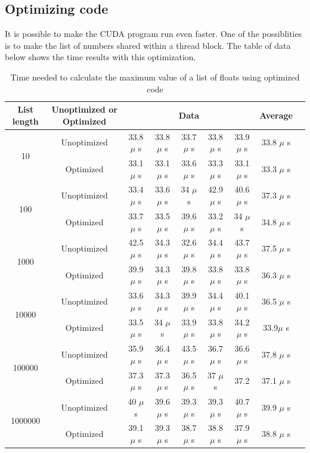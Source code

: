 \documentclass[a4paper]{article}
\begin{document}
  \subsection{Optimizing code}
  It is possible to make the CUDA program run even faster.
  One of the possiblities is to make the list of numbers shared within a thread block.
  The table of data below shows the time results with this optimization.
  \begin{table}[H]
    \caption{Time needed to calculate the maximum value of a list of floats using optimized code}
    \label{table:time}
    \begin{center}
	    \begin{tabular}{| c | c | c | c | c | c | c | c | c |}
	      \hline
	      List length & Unoptimized or Optimized & \multicolumn{5}{|c|}{Data} & Average\\
		    \hline
		    \multirow{2}{*}{10} & Unoptimized & 33.8 $\mu$ s & 33.8 $\mu$ s & 33.7 $\mu$ s & 33.8 $\mu$ s & 33.9 $\mu$ s & 33.8 $\mu$ s\\ 
		    \cline{2-8}
		    & Optimized & 33.1 $\mu$ s & 33.1 $\mu$ s & 33.6 $\mu$ s & 33.3 $\mu$ s & 33.1 $\mu$ s & 33.3 $\mu$ s\\ 
		    \hline
		    \multirow{2}{*}{100} & Unoptimized & 33.4 $\mu$ s & 33.6 $\mu$ s & 34 $\mu$ s & 42.9 $\mu$ s & 40.6 $\mu$ s & 37.3 $\mu$ s\\ 
		    \cline{2-8}
		    & Optimized & 33.7 $\mu$ s & 33.5 $\mu$ s & 39.6 $\mu$ s & 33.2 $\mu$ s & 34 $\mu$ s & 34.8 $\mu$ s\\ 
		    \hline
		    \multirow{2}{*}{1000} & Unoptimized & 42.5 $\mu$ s & 34.3 $\mu$ s & 32.6 $\mu$ s & 34.4 $\mu$ s & 43.7 $\mu$ s & 37.5 $\mu$ s\\  
		    \cline{2-8}
		    & Optimized & 39.9 $\mu$ s & 34.3 $\mu$ s & 39.8 $\mu$ s & 33.8 $\mu$ s & 33.8 $\mu$ s & 36.3 $\mu$ s\\  
		    \hline
		    \multirow{2}{*}{10000} & Unoptimized & 33.6 $\mu$ s & 34.3 $\mu$ s & 39.9 $\mu$ s & 34.4 $\mu$ s & 40.1 $\mu$ s & 36.5 $\mu$ s\\  
		    \cline{2-8}
		    & Optimized & 33.5 $\mu$ s & 34 $\mu$ s & 33.9 $\mu$ s & 33.8 $\mu$ s & 34.2 $\mu$ s & 33.9$\mu$ s\\  
		    \hline
		    \multirow{2}{*}{100000} & Unoptimized & 35.9 $\mu$ s & 36.4 $\mu$ s & 43.5 $\mu$ s & 36.7 $\mu$ s & 36.6 $\mu$ s & 37.8 $\mu$ s\\  
		    \cline{2-8}
		    & Optimized & 37.3 $\mu$ s & 37.3 $\mu$ s & 36.5 $\mu$ s & 37 $\mu$ s & 37.2 & 37.1 $\mu$ s\\
		    \hline
		    \multirow{2}{*}{1000000} & Unoptimized & 40 $\mu$ s & 39.6 $\mu$ s & 39.3 $\mu$ s & 39.3 $\mu$ s & 40.7 $\mu$ s & 39.9 $\mu$ s\\ 
		    \cline{2-8}
		    & Optimized & 39.1 $\mu$ s & 39.3 $\mu$ s & 38.7 $\mu$ s & 38.8 $\mu$ s & 37.9 $\mu$ s & 38.8 $\mu$ s\\
		    \hline
	    \end{tabular}
    \end{center}
  \end{table}
\end{document}
